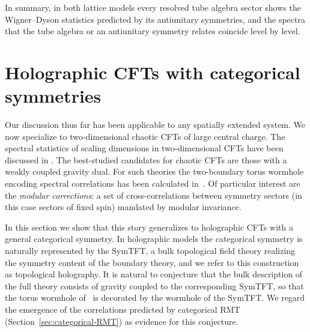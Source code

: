 \documentclass[11pt]{article}
\numberwithin{equation}{section}
\begin{document}
In summary, in both lattice models every resolved tube algebra sector shows the Wigner--Dyson statistics predicted by its antiunitary symmetries, and the spectra that the tube algebra or an antiunitary symmetry relates coincide level by level.

\section{Holographic CFTs with categorical symmetries}
\label{S:holoCat}

Our discussion thus far has been applicable to any spatially extended system. We now specialize to two-dimensional chaotic CFTs of large central charge. The spectral statistics of scaling dimensions in two-dimensional CFTs have been discussed in \cite{Haehl:2023tkr,Haehl:2023xys,Haehl:2023mhf,DiUbaldo:2023qli,Boruch:2025ilr}. 
The best-studied candidates for chaotic CFTs are those with a weakly coupled gravity dual. For such theories the two-boundary torus wormhole encoding spectral correlations has been calculated in~\cite{Cotler:2020ugk}. Of particular interest are the {\it modular corrections}: a set of cross-correlations between symmetry sectors (in this case sectors of fixed spin) mandated by modular invariance. 

In this section we show that this story generalizes to holographic CFTs with a general categorical symmetry. In holographic models the categorical symmetry is naturally represented by the SymTFT, a bulk topological field theory realizing the symmetry content of the boundary theory, and we refer to this construction as topological holography. It is natural to conjecture that the bulk description of the full theory consists of gravity coupled to the corresponding SymTFT, so that the torus wormhole of~\cite{Cotler:2020ugk} is decorated by the wormhole of the SymTFT. We regard the emergence of the correlations predicted by categorical RMT (Section~\ref{sec:categorical-RMT}) as evidence for this conjecture.
\end{document}
